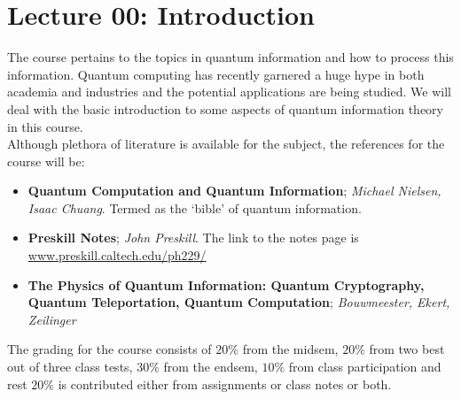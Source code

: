 \section*{Lecture 00: Introduction}
The course pertains to the topics in quantum information and how to process this information. Quantum computing has recently garnered a huge hype in both academia and industries and the potential applications are being studied. We will deal with the basic introduction to some aspects of quantum information theory in this course.\\[0.2cm]
Although plethora of literature is available for the subject, the references for the course will be:
\begin{itemize}
    \item \textbf{Quantum Computation and Quantum Information}; \textit{Michael Nielsen, Isaac Chuang}. Termed as the `bible' of quantum information.
    \item \textbf{Preskill Notes}; \textit{John Preskill}. The link to the notes page is \url{www.preskill.caltech.edu/ph229/}
    \item \textbf{The Physics of Quantum Information: Quantum Cryptography, Quantum Teleportation, Quantum Computation}; \textit{Bouwmeester, Ekert, Zeilinger}
\end{itemize}
The grading for the course consists of $20\%$ from the midsem, $20\%$ from two best out of three class tests, $30\%$ from the endsem, $10\%$ from class participation and rest $20\%$ is contributed either from assignments or class notes or both. 